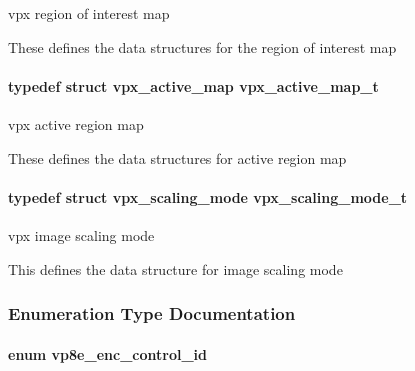 vpx region of interest map 

These defines the data structures for the region of interest map \hypertarget{group__vp8__encoder_ga7b48f7962f5061979f0f8ece6fb1cba8}{
\paragraph[{vpx\-\_\-active\-\_\-map\-\_\-t}]{\setlength{\rightskip}{0pt plus 5cm}typedef struct {\bf vpx\-\_\-active\-\_\-map}  {\bf vpx\-\_\-active\-\_\-map\-\_\-t}}}\label{group__vp8__encoder_ga7b48f7962f5061979f0f8ece6fb1cba8}


vpx active region map 

These defines the data structures for active region map \hypertarget{group__vp8__encoder_ga9600359ed9096cd96c621d9cf6c8df38}{
\paragraph[{vpx\-\_\-scaling\-\_\-mode\-\_\-t}]{\setlength{\rightskip}{0pt plus 5cm}typedef struct {\bf vpx\-\_\-scaling\-\_\-mode}  {\bf vpx\-\_\-scaling\-\_\-mode\-\_\-t}}}\label{group__vp8__encoder_ga9600359ed9096cd96c621d9cf6c8df38}


vpx image scaling mode 

This defines the data structure for image scaling mode 

\subsubsection{Enumeration Type Documentation}
\hypertarget{group__vp8__encoder_ga6deae3d561c838952552c3d3756322ec}{
\paragraph[{vp8e\-\_\-enc\-\_\-control\-\_\-id}]{\setlength{\rightskip}{0pt plus 5cm}enum {\bf vp8e\-\_\-enc\-\_\-control\-\_\-id}}}\label{group__vp8__encoder_ga6deae3d561c838952552c3d3756322ec}


